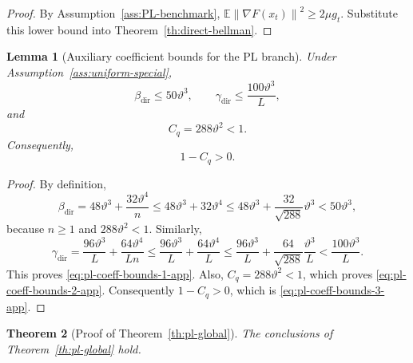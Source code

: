 \documentclass{article}
\newtheorem{theorem}{Theorem}[section]
\newtheorem{lemma}[theorem]{Lemma}
\theoremstyle{definition}
\newcommand{\EE}{\mathbb E}
\newcommand{\norm}[1]{\left\lVert #1\right\rVert}
\begin{document}
\begin{proof}
By Assumption~\ref{ass:PL-benchmark}, $\EE\norm{\nabla F(x_t)}^2\ge 2\mu g_t$.
Substitute this lower bound into Theorem~\ref{th:direct-bellman}.
\end{proof}

\begin{lemma}[Auxiliary coefficient bounds for the PL branch]
\label{lem:pl-coeff-bounds}
Under Assumption~\ref{ass:uniform-special},
\begin{equation}
\beta_{\mathrm{dir}}\le 50\vartheta^3,
\qquad
\gamma_{\mathrm{dir}}\le \frac{100\vartheta^3}{L},
\label{eq:pl-coeff-bounds-1-app}\end{equation}
and
\begin{equation}
C_q=288\vartheta^2<1.
\label{eq:pl-coeff-bounds-2-app}\end{equation}
Consequently,
\begin{equation}
1-C_q>0.
\label{eq:pl-coeff-bounds-3-app}\end{equation}
\end{lemma}

\begin{proof}
By definition,
\[
\beta_{\mathrm{dir}}
=
48\vartheta^3+\frac{32\vartheta^4}{n}
\le
48\vartheta^3+32\vartheta^4
\le
48\vartheta^3+\frac{32}{\sqrt{288}}\vartheta^3
<50\vartheta^3,
\]
because $n\ge 1$ and $288\vartheta^2<1$. Similarly,
\[
\gamma_{\mathrm{dir}}
=
\frac{96\vartheta^3}{L}+\frac{64\vartheta^4}{Ln}
\le
\frac{96\vartheta^3}{L}+\frac{64\vartheta^4}{L}
\le
\frac{96\vartheta^3}{L}+\frac{64}{\sqrt{288}}\frac{\vartheta^3}{L}
<
\frac{100\vartheta^3}{L}.
\]
This proves \eqref{eq:pl-coeff-bounds-1-app}. Also, $C_q=288\vartheta^2<1$,
which proves \eqref{eq:pl-coeff-bounds-2-app}. Consequently $1-C_q>0$, which is \eqref{eq:pl-coeff-bounds-3-app}.
\end{proof}

\begin{theorem}[Proof of Theorem~\ref{th:pl-global}]
\label{th:pl-global-proof}
The conclusions of Theorem~\ref{th:pl-global} hold.
\end{theorem}
\end{document}
